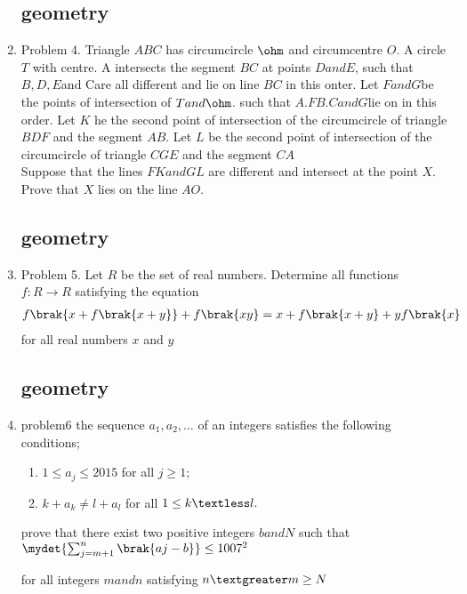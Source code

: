 \documentclass{article}
\begin{document}
\begin{enumerate}
                \subsection*{geometry}
\item Problem 4. Triangle $ABC$ has circumcircle $\ohm$ and circumcentre $O$. A circle $T$ with centre. A intersects the segment $BC$ at points $D and E$, such that $B, D, E $and Care all different and lie on line $BC$ in this onter. Let $F and G $be the points of intersection of $T and \ohm$. such that $A. F B. C and G $lie on \ohm in this order. Let $K $ he the second point of intersection of the circumcircle of triangle $BDF$ and the segment $AB$. Let $L$ be the second point of intersection of the circumcircle of triangle $CGE$ and the segment $CA$\\
Suppose that the lines $FKand GL$ are different and intersect at the point $X$. Prove that $X$ lies on the line $AO$.
               \subsection*{geometry}

\item Problem 5. Let $R$ be the set of real numbers. Determine all functions $f:R\rightarrow R$ satisfying the equation
	\begin{align}
		f\brak{x+f\brak{x+y}}+f\brak{xy}=x+f\brak{x+y}+yf\brak{x}\\
	\end{align}
for all real numbers $x$ and $y$
\subsection*{geometry}
\item problem6 the sequence $a_1,a_2, \ldots$ of an integers satisfies the following conditions;
	\begin{enumerate}
		\item $1\leq a_{j} \leq2015$ for all $j\geq 1;$
		\item $k+a_{k} \neq l+a_{l}$ for all $1\leq k \textless l.$
	\end{enumerate}	
prove that there exist two positive integers $b and N$ such that\\

$\mydet {\sum_{j=m+1}^{n} \brak {aj-b} }\leq 1007^2$

for all integers $m and n$ satisfying $n\textgreater m\geq N$


\end{enumerate}
\end{document}
